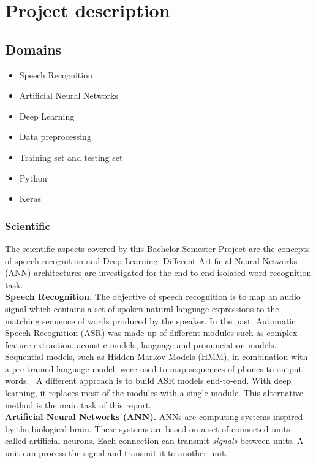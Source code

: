 
\section{Project description}
\subsection{Domains}

\begin{itemize}
        \item Speech Recognition
        \item Artificial Neural Networks
        \item Deep Learning 
        \item Data preprocessing
        \item Training set and testing set
        \item Python
        \item Keras
\end{itemize}

\subsubsection{Scientific}

The scientific aspects covered by this Bachelor Semester Project are the
concepts of speech recognition and Deep Learning. Different Artificial Neural
Networks (ANN) architectures are investigated for the end-to-end isolated word
recognition task.\\

\textbf{Speech Recognition.} The objective of speech recognition is to map an
audio signal which contains a set of spoken natural language expressions to the
matching sequence of words produced by the speaker. In the past, Automatic
Speech Recognition (ASR) was made up of different modules such as complex
feature extraction, acoustic models, language and pronunciation
models.~\cite{DBLP:journals/corr/AmodeiABCCCCCCD15} Sequential models, such as
Hidden Markov Models (HMM), in combination with a pre-trained language model,
were used to map sequences of phones to output words.~\cite{Williamsong} A
different approach is to build ASR models end-to-end. With deep learning, it
replaces most of the modules with a single module. This alternative method is
the main task of this report.\\

\textbf{Artificial Neural Networks (ANN).} ANNs are computing systems inspired
by the biological brain. These systems are based on a set of connected units
called artificial neurons. Each connection can transmit \textit{signals} between
units. A unit can process the signal and transmit it to another unit.\\

